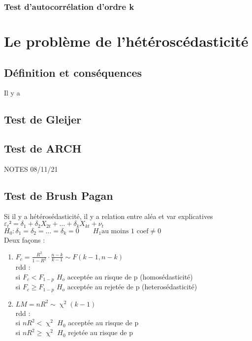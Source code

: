 \documentclass{article}
\begin{document}
\subsubsection{Test d'autocorrélation d'ordre k}
\section{Le problème de l'hétéroscédasticité}
\subsection{Définition et conséquences}
Il y a 
 \subsection{Test de Gleijer}
 
 \subsection{Test de ARCH}


NOTES 08/11/21 \\
\subsection{Test de Brush Pagan}
Si il y a hétérosédasticité, il y a relation entre aléa et var explicatives \\
$\varepsilon_{t}² = \delta_{1} + \delta_{2} X_{2t} + \ldots + \delta_{k} X_{kt} + \nu_{t}$ \\
$H_0 : \delta_1 = \delta_2 = \ldots = \delta_k = 0 \qquad H_1 \text{au moins 1 coef} \neq 0$ \\
Deux façons : 
\begin{enumerate}
    \item $F_{c} = \frac{R^2}{1-R^2} \cdot \frac{n-k}{k-1} \sim F(k-1, n-k)$ \\
        rdd :\\
        si $F_c < F_{1-p}$ $H_o$ acceptée au risque de p (homosédasticité)\\
        si $F_c \ge   F_{1-p}$ $H_o$ acceptée au rejetée de p (heterosédasticité) \\
    \item $LM = n R^2 \sim \upchi^2(k-1)$ \\
        rdd :\\
        si $nR^2 < \upchi^2$ $H_0$ acceptée au risque de p \\
        si $nR^2 \ge \upchi^2$ $H_0$ rejetée au risque de p
\end{enumerate}
\end{document}
